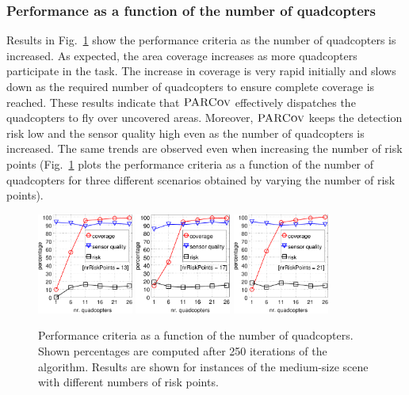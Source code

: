 \documentclass[letterpaper, 10pt, conference]{ieeeconf}
\newcommand{\Function}[1]{\ensuremath{{ \textsc{#1}}}}
\newcommand{\Name}{\Function{\small{PARCov}}}
\begin{document}
\subsubsection{Performance as a function of the number of quadcopters}
Results in Fig.~\ref{fig:ResQuads} show the performance criteria as
the number of quadcopters is increased. As expected, the area coverage
increases as more quadcopters participate in the task. The increase in
coverage is very rapid initially and slows down as the
required number of quadcopters to ensure complete coverage is reached.
These results indicate that $\Name$ effectively dispatches the
quadcopters to fly over uncovered areas. Moreover, $\Name$ keeps the
detection risk low and the sensor quality high even as the number of
quadcopters is increased. The same trends are observed even when
increasing the number of risk points (Fig.~\ref{fig:ResQuads} plots the
performance criteria as a function of the number of quadcopters for three
different scenarios obtained by varying the number of risk points).

\begin{figure}
\centering
\includegraphics[width=0.28\textwidth]{usef/figResQuadsR13}
\includegraphics[width=0.28\textwidth]{usef/figResQuadsR17}
\includegraphics[width=0.28\textwidth]{usef/figResQuadsR21}
\caption{Performance criteria as a function of the number of
  quadcopters. Shown percentages are computed after 250 iterations of
  the algorithm. Results are shown for instances of the medium-size
  scene with different numbers of risk points.}
\label{fig:ResQuads}
\end{figure}
\end{document}
